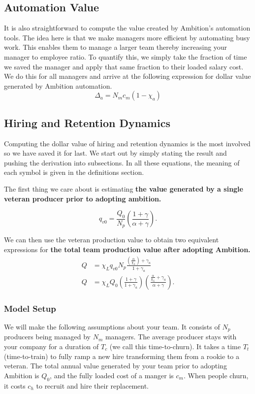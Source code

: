 \documentclass[paper=a4, fontsize=11pt abstract]{scrartcl}
\numberwithin{equation}{section}		%
\numberwithin{figure}{section}			%
\numberwithin{table}{section}				%
\begin{document}
\subsection{Automation Value}
It is also straightforward to compute the value created by Ambition's automation tools. The idea here is that we make managers more efficient by automating busy work.  This enables them to manage a larger team thereby increasing your manager to employee ratio.  To quantify this, we simply take the fraction of time we saved the manager and apply that same fraction to their loaded salary cost.  We do this for all managers and arrive at the following expression for dollar value generated by Ambition automation.
\begin{equation}
    \Delta_a = N_m c_m \left(1 - \chi_a\right)
\end{equation}
\subsection{Hiring and Retention Dynamics}
Computing the dollar value of hiring and retention dynamics is the most involved so we have saved it for last.  We start out by simply stating the result and pushing the derivation into subsections. In all these equations, the meaning of each symbol is given in the definitions section.

The first thing we care about is estimating \textbf{the value generated by a single veteran producer prior to adopting ambition.}

\begin{equation}
    q_{v0} = \frac{Q_0}{N_p}\left(\frac{1 + \gamma}{\alpha + \gamma}\right).
\end{equation}

We can then use the veteran production value to obtain two equivalent expressions for \textbf{the total team production value after adopting Ambition.}
\begin{align}
    Q &= \chi_L q_{v0} N_p\frac{\left(\frac{\alpha}{\chi_L}\right) + \gamma_a}{1 + \gamma_a} \label{Q0} \\
    Q &= \chi_L Q_0  \left(\frac{1+\gamma}{1 + \gamma_a}\right) \left(\frac{\frac{\alpha}{\chi_L} + \gamma_a  }{\alpha + \gamma}\right).
\end{align}

\subsubsection{Model Setup}
We will make the following assumptions about your team.  It consists of $N_p$ producers being managed by $N_m$ managers.  The average producer stays with your company for a duration of $T_c$ (we call this time-to-churn).  It takes a time $T_t$ (time-to-train) to fully ramp a new hire transforming them from a rookie to a veteran. The total annual value generated by your team prior to adopting Ambition is $Q_0$, and the fully loaded cost of a manger is $c_m$.  When people churn, it costs $c_h$ to recruit and hire their replacement.
\end{document}
